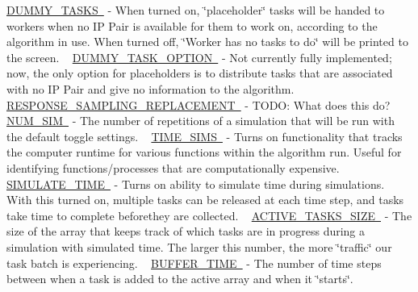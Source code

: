 \mbox{\hyperlink{namespacedynamicfilterapp_1_1toggles_a16edb4f07d82f0494347a0977663e6f4}{D\+U\+M\+M\+Y\+\_\+\+T\+A\+S\+KS }} -\/ When turned on, \char`\"{}placeholder\char`\"{} tasks will be handed to workers when no IP Pair is available for them to work on, according to the algorithm in use. When turned off, \char`\"{}\+Worker has no tasks to do\char`\"{} will be printed to the screen. ~\newline
 \mbox{\hyperlink{namespacedynamicfilterapp_1_1toggles_a0b87eab5c4f4f0b986a43805f825d2c6}{D\+U\+M\+M\+Y\+\_\+\+T\+A\+S\+K\+\_\+\+O\+P\+T\+I\+ON }} -\/ Not currently fully implemented; now, the only option for placeholders is to distribute tasks that are associated with no IP Pair and give no information to the algorithm. ~\newline
 \mbox{\hyperlink{namespacedynamicfilterapp_1_1toggles_a1f569cdee80dfd4d7a2d7a3f3aebc47f}{R\+E\+S\+P\+O\+N\+S\+E\+\_\+\+S\+A\+M\+P\+L\+I\+N\+G\+\_\+\+R\+E\+P\+L\+A\+C\+E\+M\+E\+NT }} -\/ T\+O\+DO\+: What does this do? ~\newline
 \mbox{\hyperlink{namespacedynamicfilterapp_1_1toggles_a3baf5565851cd87736238d8dddfc1106}{N\+U\+M\+\_\+\+S\+IM }} -\/ The number of repetitions of a simulation that will be run with the default toggle settings. ~\newline
 \mbox{\hyperlink{namespacedynamicfilterapp_1_1toggles_a3dd608f63971ae7536ce7be96396c510}{T\+I\+M\+E\+\_\+\+S\+I\+MS }} -\/ Turns on functionality that tracks the computer runtime for various functions within the algorithm run. Useful for identifying functions/processes that are computationally expensive. ~\newline
 \mbox{\hyperlink{namespacedynamicfilterapp_1_1toggles_af689b6dbf6a3a082bbfb9f6decf1a805}{S\+I\+M\+U\+L\+A\+T\+E\+\_\+\+T\+I\+ME }} -\/ Turns on ability to simulate time during simulations. With this turned on, multiple tasks can be released at each time step, and tasks take time to complete beforethey are collected. ~\newline
 \mbox{\hyperlink{namespacedynamicfilterapp_1_1toggles_a374727dba0574510b39c1e2871f69e48}{A\+C\+T\+I\+V\+E\+\_\+\+T\+A\+S\+K\+S\+\_\+\+S\+I\+ZE }} -\/ The size of the array that keeps track of which tasks are in progress during a simulation with simulated time. The larger this number, the more \char`\"{}traffic\char`\"{} our task batch is experiencing. ~\newline
 \mbox{\hyperlink{namespacedynamicfilterapp_1_1toggles_a04a9eab148403f1f27d44b38211aad04}{B\+U\+F\+F\+E\+R\+\_\+\+T\+I\+ME }} -\/ The number of time steps between when a task is added to the active array and when it \char`\"{}starts\char`\"{}. ~\newline
